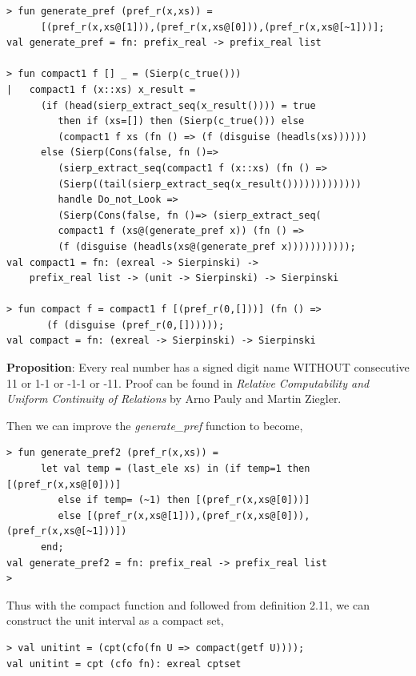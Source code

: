 \documentclass[12pt,twoside,notitlepage]{report}
\begin{document}
{
\begin{verbatim}
> fun generate_pref (pref_r(x,xs)) = 
      [(pref_r(x,xs@[1])),(pref_r(x,xs@[0])),(pref_r(x,xs@[~1]))];
val generate_pref = fn: prefix_real -> prefix_real list

> fun compact1 f [] _ = (Sierp(c_true()))
|   compact1 f (x::xs) x_result = 
      (if (head(sierp_extract_seq(x_result()))) = true
         then if (xs=[]) then (Sierp(c_true())) else
         (compact1 f xs (fn () => (f (disguise (headls(xs))))))
      else (Sierp(Cons(false, fn ()=> 
         (sierp_extract_seq(compact1 f (x::xs) (fn () =>
         (Sierp((tail(sierp_extract_seq(x_result()))))))))))))
         handle Do_not_Look => 
         (Sierp(Cons(false, fn ()=> (sierp_extract_seq(
         compact1 f (xs@(generate_pref x)) (fn () => 
         (f (disguise (headls(xs@(generate_pref x))))))))))); 
val compact1 = fn: (exreal -> Sierpinski) ->
    prefix_real list -> (unit -> Sierpinski) -> Sierpinski

> fun compact f = compact1 f [(pref_r(0,[]))] (fn () =>
       (f (disguise (pref_r(0,[]))))); 
val compact = fn: (exreal -> Sierpinski) -> Sierpinski
\end{verbatim}
} 


\textbf{Proposition}: Every real number has a signed digit name WITHOUT consecutive 11 or 1-1 or -1-1 or -11. \cite{paulyziegler} Proof can be found in \emph{Relative Computability and Uniform Continuity of Relations} by Arno Pauly and Martin Ziegler.

Then we can improve the \textit{generate\_pref} function to become, 


{
\begin{verbatim}
> fun generate_pref2 (pref_r(x,xs)) = 
      let val temp = (last_ele xs) in (if temp=1 then [(pref_r(x,xs@[0]))]
         else if temp= (~1) then [(pref_r(x,xs@[0]))]
         else [(pref_r(x,xs@[1])),(pref_r(x,xs@[0])),(pref_r(x,xs@[~1]))])
      end;
val generate_pref2 = fn: prefix_real -> prefix_real list
> 
\end{verbatim}
} 

Thus with the compact function and followed from definition 2.11, we can construct the unit interval as a compact set, 

{
\begin{verbatim}
> val unitint = (cpt(cfo(fn U => compact(getf U))));
val unitint = cpt (cfo fn): exreal cptset
\end{verbatim}
} 
\end{document}
